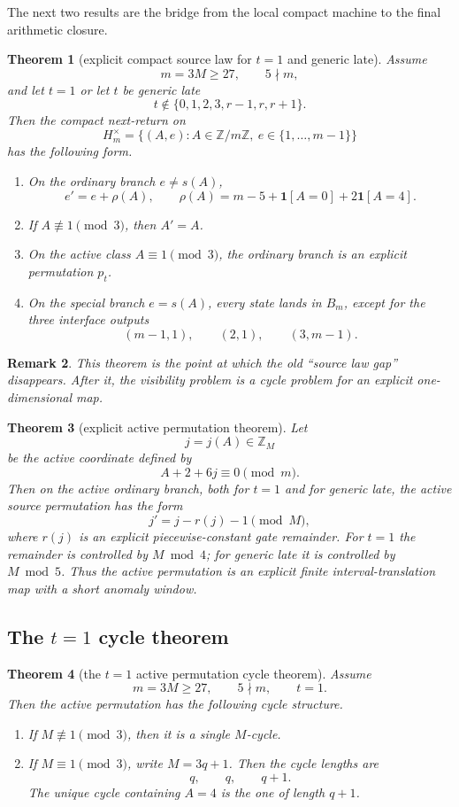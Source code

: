 \documentclass[11pt]{article}
\newtheorem{theorem}{Theorem}[section]
\newtheorem{remark}[theorem]{Remark}
\newcommand{\Z}{\mathbb Z}
\newcommand{\1}{\mathbf 1}
\newcommand{\Bm}{B_m}
\newcommand{\Hmx}{H_m^\times}
\begin{document}
The next two results are the bridge from the local compact machine to the final arithmetic closure.

\begin{theorem}[explicit compact source law for \(t=1\) and generic late]
Assume
\[
m=3M\ge 27,\qquad 5\nmid m,
\]
and let \(t=1\) or let \(t\) be generic late
\[
t\notin \{0,1,2,3,r-1,r,r+1\}.
\]
Then the compact next-return on
\[
\Hmx=\{(A,e): A\in \Z/m\Z,\ e\in\{1,\dots,m-1\}\}
\]
has the following form.
\begin{enumerate}[label=\textup{(\arabic*)},leftmargin=2.8em]
\item On the ordinary branch \(e\ne s(A)\),
\[
e' = e+\rho(A),\qquad \rho(A)=m-5+\1[A=0]+2\1[A=4].
\]
\item If \(A\not\equiv 1 \pmod 3\), then \(A'=A\).
\item On the active class \(A\equiv 1 \pmod 3\), the ordinary branch is an explicit permutation \(p_t\).
\item On the special branch \(e=s(A)\), every state lands in \(\Bm\), except for the three interface outputs
\[
(m-1,1),\qquad (2,1),\qquad (3,m-1).
\]
\end{enumerate}
\end{theorem}

\begin{remark}
This theorem is the point at which the old ``source law gap'' disappears.
After it, the visibility problem is a cycle problem for an explicit one-dimensional map.
\end{remark}

\begin{theorem}[explicit active permutation theorem]
Let
\[
j=j(A)\in \Z_M
\]
be the active coordinate defined by
\[
A+2+6j\equiv 0 \pmod m.
\]
Then on the active ordinary branch, both for \(t=1\) and for generic late, the active source permutation has the form
\[
j' = j-r(j)-1 \pmod M,
\]
where \(r(j)\) is an explicit piecewise-constant gate remainder.
For \(t=1\) the remainder is controlled by \(M\bmod 4\); for generic late it is controlled by \(M\bmod 5\).
Thus the active permutation is an explicit finite interval-translation map with a short anomaly window.
\end{theorem}

\subsection{The \(t=1\) cycle theorem}

\begin{theorem}[the \(t=1\) active permutation cycle theorem]
Assume
\[
m=3M\ge 27,\qquad 5\nmid m,\qquad t=1.
\]
Then the active permutation has the following cycle structure.
\begin{enumerate}[label=\textup{(\arabic*)},leftmargin=2.8em]
\item If \(M\not\equiv 1 \pmod 3\), then it is a single \(M\)-cycle.
\item If \(M\equiv 1 \pmod 3\), write \(M=3q+1\). Then the cycle lengths are
\[
q,\qquad q,\qquad q+1.
\]
The unique cycle containing \(A=4\) is the one of length \(q+1\).
\end{enumerate}
\end{theorem}
\end{document}
